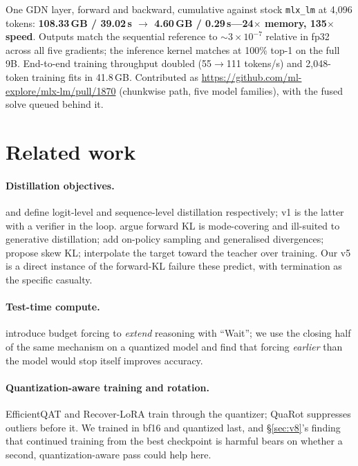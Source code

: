 \documentclass[11pt]{article}
\newcommand{\PRURL}{\url{https://github.com/ml-explore/mlx-lm/pull/1870}}
\begin{document}
One GDN layer, forward and backward, cumulative against stock \texttt{mlx\_lm}
at 4{,}096 tokens: \textbf{108.33\,GB / 39.02\,s $\to$ 4.60\,GB / 0.29\,s---24$\times$
memory, 135$\times$ speed}.  Outputs match the sequential reference to
$\sim$$3\times10^{-7}$ relative in fp32 across all five gradients; the inference
kernel matches at 100\% top-1 on the full 9B.  End-to-end training throughput
doubled (55$\to$111 tokens/s) and 2{,}048-token training fits in 41.8\,GB.
Contributed as \PRURL{} (chunkwise path, five model families), with the fused
solve queued behind it.

\section{Related work}

\paragraph{Distillation objectives.}
\citet{hinton2015distilling} and \citet{kim2016sequence} define logit-level and
sequence-level distillation respectively; v1 is the latter with a verifier in
the loop.  \citet{gu2023minillm} argue forward KL is mode-covering and ill-suited
to generative distillation; \citet{agarwal2023gkd} add on-policy sampling and
generalised divergences; \citet{ko2024distillm} propose skew KL;
\citet{shing2025taid} interpolate the target toward the teacher over training.
Our v5 is a direct instance of the forward-KL failure these predict, with
termination as the specific casualty.

\paragraph{Test-time compute.}
\citet{muennighoff2025s1} introduce budget forcing to \emph{extend} reasoning
with ``Wait''; we use the closing half of the same mechanism on a quantized
model and find that forcing \emph{earlier} than the model would stop itself
improves accuracy.

\paragraph{Quantization-aware training and rotation.}
EfficientQAT \citep{chen2024efficientqat} and Recover-LoRA
\citep{recoverlora2025} train through the quantizer; QuaRot
\citep{ashkboos2024quarot} suppresses outliers before it.  We trained in bf16
and quantized last, and \S\ref{sec:v8}'s finding that continued training from
the best checkpoint is harmful bears on whether a second, quantization-aware
pass could help here.
\end{document}
